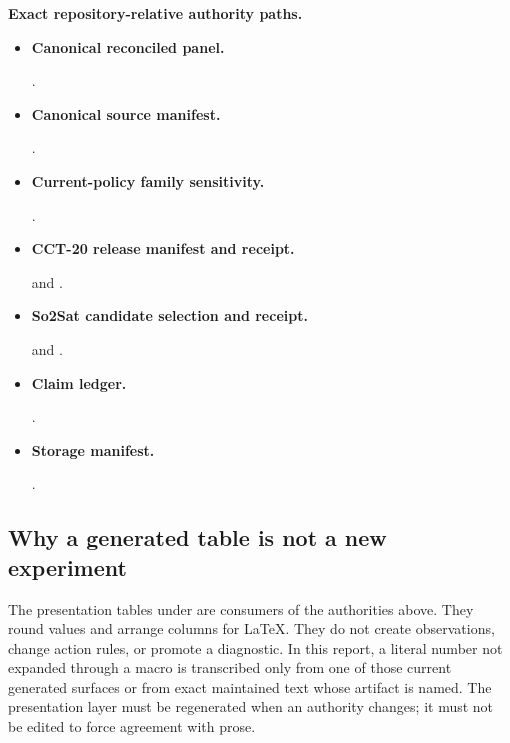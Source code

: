 \noindent\textbf{Exact repository-relative authority paths.}
\begin{itemize}
  \item \textbf{Canonical reconciled panel.} {\raggedright
  .\par}
  \item \textbf{Canonical source manifest.} {\raggedright
  .\par}
  \item \textbf{Current-policy family sensitivity.} {\raggedright
  .\par}
  \item \textbf{CCT-20 release manifest and receipt.} {\raggedright
   and
  .\par}
  \item \textbf{So2Sat candidate selection and receipt.} {\raggedright
  and
  .\par}
  \item \textbf{Claim ledger.} {\raggedright {}.\par}
  \item \textbf{Storage manifest.} {\raggedright {}.\par}
\end{itemize}

\subsection{Why a generated table is not a new experiment}
\label{fr:sec-generated-surfaces}

The presentation tables under  are consumers of the authorities above.
They round values and arrange columns for LaTeX.  They do not create observations, change action
rules, or promote a diagnostic.  In this report, a literal number not expanded through a macro is
transcribed only from one of those current generated surfaces or from exact maintained text whose
artifact is named.  The presentation layer must be regenerated when an authority changes; it must
not be edited to force agreement with prose.


